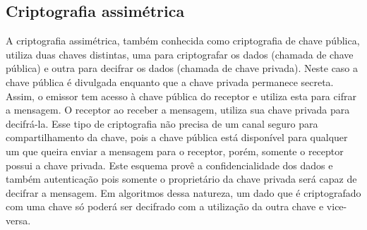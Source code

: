 %
%
\subsection{Criptografia assimétrica}
A criptografia assimétrica, também conhecida como criptografia de chave pública, utiliza duas chaves distintas, uma para criptografar os dados (chamada de chave pública) e outra para decifrar os dados (chamada de chave privada). Neste caso a chave pública é divulgada enquanto que a chave privada permanece secreta. Assim, o emissor tem acesso à chave pública do receptor e utiliza esta para cifrar a mensagem. O receptor ao receber a mensagem, utiliza sua chave privada para decifrá-la. Esse tipo de criptografia não precisa de um canal seguro para compartilhamento da chave, pois a chave pública está disponível para qualquer um que queira enviar a mensagem para o receptor, porém, somente o receptor possui a chave privada.
Este esquema provê a confidencialidade dos dados e também autenticação pois somente o proprietário da chave privada será capaz de decifrar a mensagem. Em algoritmos dessa natureza, um dado que é criptografado com uma chave só poderá ser decifrado com a utilização da outra chave e vice-versa.
